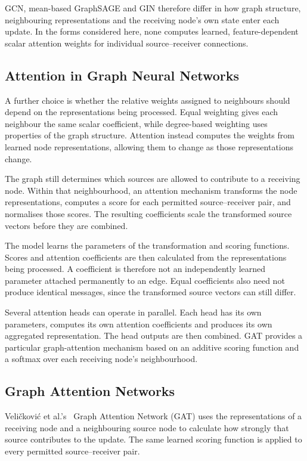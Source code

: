 \documentclass[11pt,a4paper]{article}
\begin{document}
GCN, mean-based GraphSAGE and GIN therefore differ in how graph structure, neighbouring representations and the receiving node's own state enter each update. In the forms considered here, none computes learned, feature-dependent scalar attention weights for individual source--receiver connections.

\subsection{Attention in Graph Neural Networks}
\label{sec:attention}

A further choice is whether the relative weights assigned to neighbours should depend on the representations being processed. Equal weighting gives each neighbour the same scalar coefficient, while degree-based weighting uses properties of the graph structure. Attention instead computes the weights from learned node representations, allowing them to change as those representations change.

The graph still determines which sources are allowed to contribute to a receiving node. Within that neighbourhood, an attention mechanism transforms the node representations, computes a score for each permitted source--receiver pair, and normalises those scores. The resulting coefficients scale the transformed source vectors before they are combined.

The model learns the parameters of the transformation and scoring functions. Scores and attention coefficients are then calculated from the representations being processed. A coefficient is therefore not an independently learned parameter attached permanently to an edge. Equal coefficients also need not produce identical messages, since the transformed source vectors can still differ.

Several attention heads can operate in parallel. Each head has its own parameters, computes its own attention coefficients and produces its own aggregated representation. The head outputs are then combined. GAT provides a particular graph-attention mechanism based on an additive scoring function and a softmax over each receiving node's neighbourhood.

\subsection{Graph Attention Networks}
\label{sec:gat}

Veli\v{c}kovi\'{c} et al.'s~\cite{velickovic2018gat} Graph Attention Network (GAT) uses the representations of a receiving node and a neighbouring source node to calculate how strongly that source contributes to the update. The same learned scoring function is applied to every permitted source--receiver pair.
\end{document}
